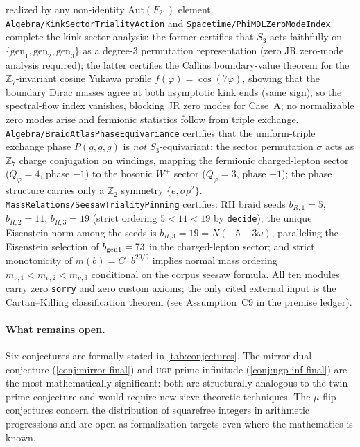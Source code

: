 \documentclass[11pt,a4paper]{article}
\theoremstyle{definition}
\newcommand{\ugp}{\textsc{ugp}}
\begin{document}
realized by any non-identity $\mathrm{Aut}(F_{21})$ element.
\texttt{Algebra/KinkSectorTrialityAction} and \texttt{Spacetime/PhiMDLZeroModeIndex}
complete the kink sector analysis: the former certifies that $S_3$ acts faithfully
on $\{\mathrm{gen}_1, \mathrm{gen}_2, \mathrm{gen}_3\}$ as a degree-3 permutation
representation (zero JR zero-mode analysis required); the latter certifies the
Callias boundary-value theorem for the $\mathbb{Z}_7$-invariant cosine Yukawa profile
$f(\varphi) = \cos(7\varphi)$, showing that the boundary Dirac masses agree at both
asymptotic kink ends (same sign), so the spectral-flow index vanishes, blocking JR
zero modes for Case~A; no normalizable zero modes arise and fermionic statistics
follow from triple exchange.
\texttt{Algebra/BraidAtlasPhaseEquivariance} certifies that the uniform-triple
exchange phase $P(g,g,g)$ is \emph{not} $S_3$-equivariant: the sector permutation
$\sigma$ acts as $\mathbb{Z}_7$ charge conjugation on windings, mapping the fermionic
charged-lepton sector ($Q_\varphi = 4$, phase $-1$) to the bosonic $W^+$ sector
($Q_\varphi = 3$, phase $+1$); the phase structure carries only a $\mathbb{Z}_2$
symmetry $\{e, \sigma\rho^2\}$.
\texttt{MassRelations/SeesawTrialityPinning} certifies: RH braid seeds
$b_{R,1} = 5$, $b_{R,2} = 11$, $b_{R,3} = 19$ (strict ordering $5 < 11 < 19$
by \texttt{decide}); the unique Eisenstein norm among the seeds is $b_{R,3} = 19 =
N(-5-3\omega)$, paralleling the Eisenstein selection of $b_{\rm gen1} = 73$ in the
charged-lepton sector; and strict monotonicity of $m(b) = C \cdot b^{29/9}$ implies
normal mass ordering $m_{\nu,1} < m_{\nu,2} < m_{\nu,3}$ conditional on the corpus
seesaw formula.
All ten modules carry zero \texttt{sorry} and zero custom axioms; the only cited
external input is the Cartan--Killing classification theorem
(see Assumption~C9 in the premise ledger).

\paragraph{What remains open.}
Six conjectures are formally stated in \cref{tab:conjectures}.
The mirror-dual conjecture (\cref{conj:mirror-final}) and \ugp{} prime
infinitude (\cref{conj:ugp-inf-final}) are the most
mathematically significant: both are structurally analogous to the
twin prime conjecture and would require new sieve-theoretic techniques.
The $\mu$-flip conjectures concern the distribution of squarefree
integers in arithmetic progressions and are open as formalization
targets even where the mathematics is known.
\end{document}
